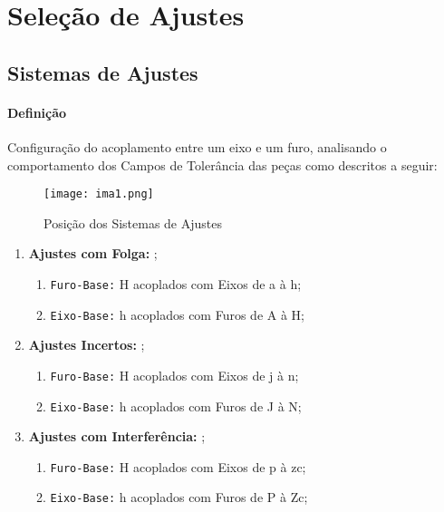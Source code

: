 \documentclass{article}
\begin{document}
    \section{Seleção de Ajustes}
        \subsection{Sistemas de Ajustes}
            \paragraph{Definição}Configuração do acoplamento entre um eixo e um furo, analisando o comportamento dos Campos de Tolerância das peças como descritos a seguir:
                \begin{figure}[H]
                    \centering
                    \texttt{[image: ima1.png]}
                    \caption{Posição dos Sistemas de Ajustes}\label{fig:ajusts}
                \end{figure} \noindent
                \begin{enumerate}[noitemsep]
                    \item \textbf{Ajustes com Folga:} ;
                        \begin{enumerate}[noitemsep]
                            \item \texttt{Furo-Base:} H acoplados com Eixos de a à h;
                            \item \texttt{Eixo-Base:} h acoplados com Furos de A à H;
                        \end{enumerate}
                    \item \textbf{Ajustes Incertos:} ;
                        \begin{enumerate}[noitemsep]
                            \item \texttt{Furo-Base:} H acoplados com Eixos de j à n;
                            \item \texttt{Eixo-Base:} h acoplados com Furos de J à N;
                        \end{enumerate}
                    \item \textbf{Ajustes com Interferência:} ;
                        \begin{enumerate}[noitemsep]
                            \item \texttt{Furo-Base:} H acoplados com Eixos de p à zc;
                            \item \texttt{Eixo-Base:} h acoplados com Furos de P à Zc;
                        \end{enumerate}
                \end{enumerate}
\end{document}
